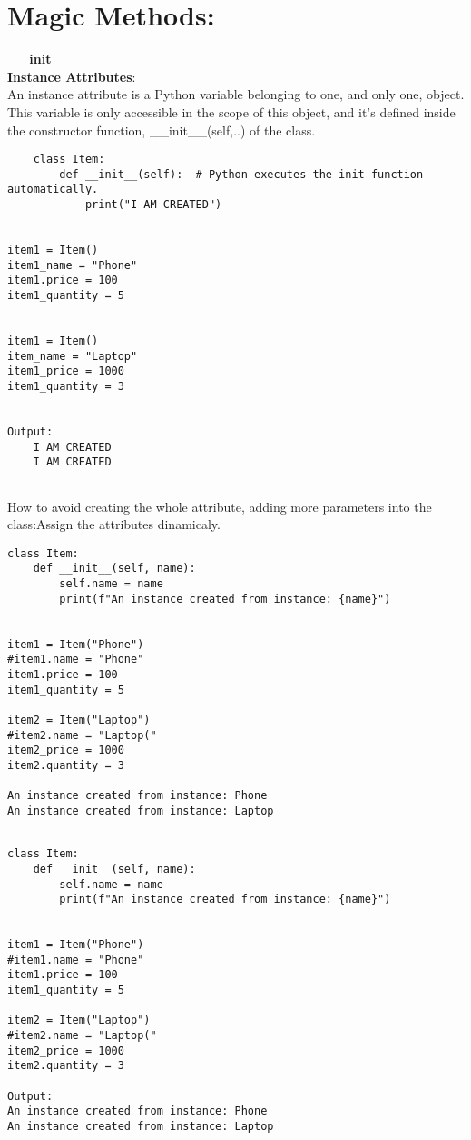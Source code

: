 \documentclass{article}
\begin{document}
\section{Magic Methods:}

\textbf{\_\_init\_\_}\\

\noindent\textbf{Instance Attributes}:\\
An instance attribute is a Python variable belonging to one, and only one, object. This variable is only accessible in the scope of this object, and it's defined inside the constructor function, \_\_init\_\_(self,..) of the class.

\begin{lstlisting}
	class Item:
		def __init__(self):  # Python executes the init function automatically.
			print("I AM CREATED")
			
		
item1 = Item()
item1_name = "Phone"
item1.price = 100
item1_quantity = 5
		
		
item1 = Item()
item_name = "Laptop"
item1_price = 1000
item1_quantity = 3


Output:
	I AM CREATED
	I AM CREATED
	
\end{lstlisting}
How to avoid creating the whole attribute, adding more parameters into the class:Assign the attributes dinamicaly. 
\begin{lstlisting}
class Item:
	def __init__(self, name):
		self.name = name
		print(f"An instance created from instance: {name}")
	
	
item1 = Item("Phone")
#item1.name = "Phone"
item1.price = 100
item1_quantity = 5
	
item2 = Item("Laptop")
#item2.name = "Laptop("
item2_price = 1000
item2.quantity = 3
	
An instance created from instance: Phone
An instance created from instance: Laptop
	
\end{lstlisting}


\begin{lstlisting}
class Item:
	def __init__(self, name):
		self.name = name
		print(f"An instance created from instance: {name}")
	
	
item1 = Item("Phone")
#item1.name = "Phone"
item1.price = 100
item1_quantity = 5
	
item2 = Item("Laptop")
#item2.name = "Laptop("
item2_price = 1000
item2.quantity = 3
	
Output:	
An instance created from instance: Phone
An instance created from instance: Laptop
	
\end{lstlisting}
\end{document}
